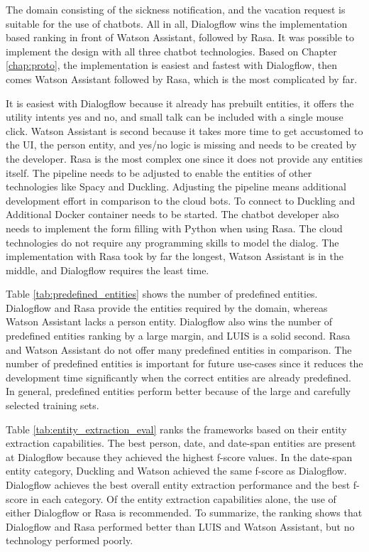 The domain consisting of the sickness notification, and the vacation request is suitable for the use of chatbots.
All in all, Dialogflow wins the implementation based ranking in front of Watson Assistant, followed by Rasa.
It was possible to implement the design with all three chatbot technologies.
Based on Chapter \ref{chap:proto}, the implementation is easiest and fastest with Dialogflow, then comes Watson Assistant followed by Rasa, which is the most complicated by far.

It is easiest with Dialogflow because it already has prebuilt entities, it offers the utility intents yes and no, and small talk can be included with a single mouse click.
Watson Assistant is second because it takes more time to get accustomed to the UI, the person entity, and yes/no logic is missing and needs to be created by the developer.
Rasa is the most complex one since it does not provide any entities itself.
The pipeline needs to be adjusted to enable the entities of other technologies like Spacy and Duckling.
Adjusting the pipeline means additional development effort in comparison to the cloud bots.
To connect to Duckling and Additional Docker container needs to be started.
The chatbot developer also needs to implement the form filling with Python when using Rasa. 
The cloud technologies do not require any programming skills to model the dialog.
The implementation with Rasa took by far the longest, Watson Assistant is in the middle, and Dialogflow requires the least time.

Table \ref{tab:predefined_entities} shows the number of predefined entities.
Dialogflow and Rasa provide the entities required by the domain, whereas Watson Assistant lacks a person entity.
Dialogflow also wins the number of predefined entities ranking by a large margin, and LUIS is a solid second.
Rasa and Watson Assistant do not offer many predefined entities in comparison.
The number of predefined entities is important for future use-cases since it reduces the development time significantly when the correct entities are already predefined. 
In general, predefined entities perform better because of the large and carefully selected training sets.

Table \ref{tab:entity_extraction_eval} ranks the frameworks based on their 
entity extraction capabilities.
The best person, date, and date-span entities are present at Dialogflow because they achieved the highest f-score values.
In the date-span entity category, Duckling and Watson achieved the same f-score as Dialogflow.
Dialogflow achieves the best overall entity extraction performance and the best f-score in each category. 
Of the entity extraction capabilities alone, the use of either Dialogflow or Rasa is recommended.
To summarize, the ranking shows that Dialogflow and Rasa performed better than LUIS and Watson Assistant, but no technology performed poorly.

